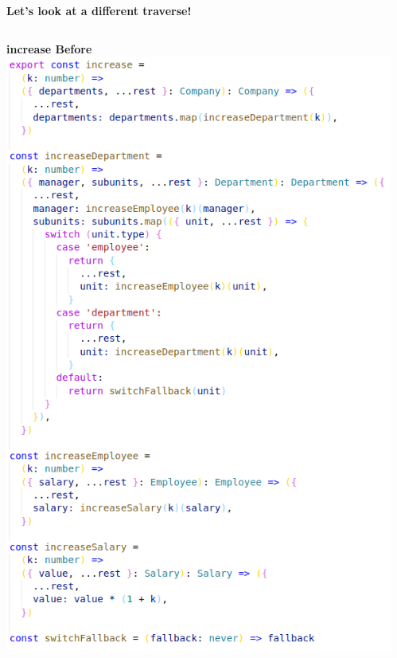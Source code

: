 \documentclass[14pt]{beamer}
\begin{document}
\begin{frame}
  \vfill
  \centering\textbf{Let's look at a different traverse!}
  \vfill
\end{frame}

\begin{frame}
  \begin{columns}
    \begin{column}{.5\textwidth}
      \vspace{1em}
      \centering\textbf{increase Before}
      \includegraphics[height=0.7\textheight,width=\textwidth,keepaspectratio]{graphics/increase-naive-ts.png}
    \end{column}
    \begin{column}{.5\textwidth}
      \vspace{1em}

\end{column}
\end{columns}
\end{frame}
\end{document}

